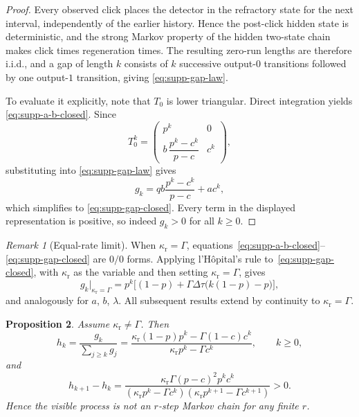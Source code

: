\documentclass[11pt]{amsart}
\numberwithin{equation}{section}
\newtheorem{proposition}{Proposition}[section]
\theoremstyle{remark}
\newtheorem{remark}[proposition]{Remark}
\begin{document}
\begin{proof}
Every observed click places the detector in the refractory state for the next interval, independently of the earlier history. Hence the post-click hidden state is deterministic, and the strong Markov property of the hidden two-state chain makes click times regeneration times. The resulting zero-run lengths are therefore i.i.d., and a gap of length $k$ consists of $k$ successive output-$0$ transitions followed by one output-$1$ transition, giving \cref{eq:supp-gap-law}.

To evaluate it explicitly, note that $T_0$ is lower triangular. Direct integration yields \cref{eq:supp-a-b-closed}. Since
\[
T_0^k=
\begin{pmatrix}
 p^k & 0 \\
 b\,\dfrac{p^k-c^k}{p-c} & c^k
\end{pmatrix},
\]
substituting into \cref{eq:supp-gap-law} gives
\[
g_k=q b\frac{p^k-c^k}{p-c}+ac^k,
\]
which simplifies to \cref{eq:supp-gap-closed}. Every term in the displayed representation is positive, so indeed $g_k>0$ for all $k\ge0$.
\end{proof}

\begin{remark}[Equal-rate limit]\label{rem:supp-equal-rate}
When $\kappa_{\mathrm r}=\Gamma$, equations~\eqref{eq:supp-a-b-closed}--\eqref{eq:supp-gap-closed} are $0/0$ forms. Applying l'H\^opital's rule to~\eqref{eq:supp-gap-closed}, with $\kappa_{\mathrm r}$ as the variable and then setting $\kappa_{\mathrm r}=\Gamma$, gives
\[
g_k\big|_{\kappa_{\mathrm r}=\Gamma} = p^k\bigl[(1-p)+\Gamma\Delta\tau\bigl(k(1-p)-p\bigr)\bigr],
\]
and analogously for $a$, $b$, $\lambda$. All subsequent results extend by continuity to $\kappa_{\mathrm r}=\Gamma$.
\end{remark}

\begin{proposition}\label{prop:supp-hazard}
Assume $\kappa_{\mathrm r}\neq\Gamma$. Then
\begin{equation}\label{eq:supp-hazard}
h_k=\frac{g_k}{\sum_{j\ge k}g_j}
=\frac{\kappa_{\mathrm r}(1-p)p^k-\Gamma(1-c)c^k}{\kappa_{\mathrm r}p^k-\Gamma c^k},
\qquad k\ge0,
\end{equation}
and
\begin{equation}\label{eq:supp-hazard-diff}
h_{k+1}-h_k=
\frac{\kappa_{\mathrm r}\Gamma(p-c)^2p^kc^k}
{(\kappa_{\mathrm r}p^k-\Gamma c^k)(\kappa_{\mathrm r}p^{k+1}-\Gamma c^{k+1})}>0.
\end{equation}
Hence the visible process is not an $r$-step Markov chain for any finite $r$.
\end{proposition}
\end{document}
